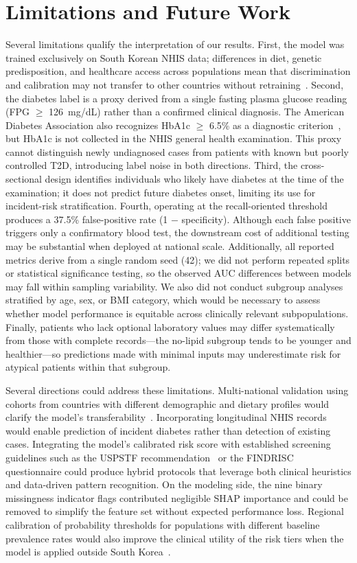 \section{Limitations and Future Work}
\label{sec:limitations}

Several limitations qualify the interpretation of our results.
First, the model was trained exclusively on South Korean NHIS data; differences in diet, genetic predisposition, and healthcare access across populations mean that discrimination and calibration may not transfer to other countries without retraining~\cite{Sun2022idf}.
Second, the diabetes label is a proxy derived from a single fasting plasma glucose reading (FPG $\geq$ 126~mg/dL) rather than a confirmed clinical diagnosis.
The American Diabetes Association also recognizes HbA1c $\geq$ 6.5\% as a diagnostic criterion~\cite{ADA2024standards}, but HbA1c is not collected in the NHIS general health examination.
This proxy cannot distinguish newly undiagnosed cases from patients with known but poorly controlled T2D, introducing label noise in both directions.
Third, the cross-sectional design identifies individuals who likely have diabetes at the time of the examination; it does not predict future diabetes onset, limiting its use for incident-risk stratification.
Fourth, operating at the recall-oriented threshold produces a 37.5\% false-positive rate (1 $-$ specificity).
Although each false positive triggers only a confirmatory blood test, the downstream cost of additional testing may be substantial when deployed at national scale.
Additionally, all reported metrics derive from a single random seed (42); we did not perform repeated splits or statistical significance testing, so the observed AUC differences between models may fall within sampling variability.
We also did not conduct subgroup analyses stratified by age, sex, or BMI category, which would be necessary to assess whether model performance is equitable across clinically relevant subpopulations.
Finally, patients who lack optional laboratory values may differ systematically from those with complete records---the no-lipid subgroup tends to be younger and healthier---so predictions made with minimal inputs may underestimate risk for atypical patients within that subgroup.

Several directions could address these limitations.
Multi-national validation using cohorts from countries with different demographic and dietary profiles would clarify the model's transferability~\cite{Lee2025multicohort}.
Incorporating longitudinal NHIS records would enable prediction of incident diabetes rather than detection of existing cases.
Integrating the model's calibrated risk score with established screening guidelines such as the USPSTF recommendation~\cite{USPSTF2021screening} or the FINDRISC questionnaire could produce hybrid protocols that leverage both clinical heuristics and data-driven pattern recognition.
On the modeling side, the nine binary missingness indicator flags contributed negligible SHAP importance and could be removed to simplify the feature set without expected performance loss.
Regional calibration of probability thresholds for populations with different baseline prevalence rates would also improve the clinical utility of the risk tiers when the model is applied outside South Korea~\cite{Sun2022idf}.
